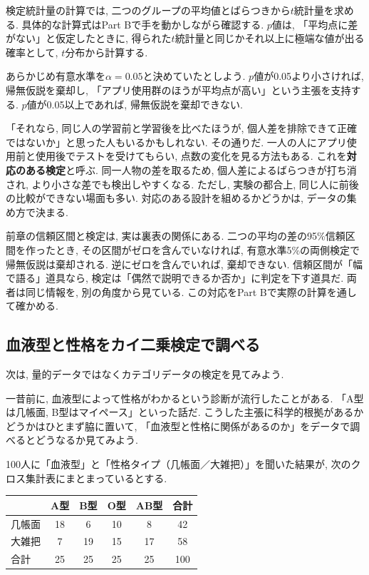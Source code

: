     検定統計量の計算では, 二つのグループの平均値とばらつきから$t$統計量を求める.
    具体的な計算式はPart Bで手を動かしながら確認する.
    $p$値は, 「平均点に差がない」と仮定したときに, 得られた$t$統計量と同じかそれ以上に極端な値が出る確率として, $t$分布から計算する.

    あらかじめ有意水準を$\alpha = 0.05$と決めていたとしよう.
    $p$値が0.05より小さければ, 帰無仮説を棄却し, 「アプリ使用群のほうが平均点が高い」という主張を支持する.
    $p$値が0.05以上であれば, 帰無仮説を棄却できない.

    「それなら, 同じ人の学習前と学習後を比べたほうが, 個人差を排除できて正確ではないか」と思った人もいるかもしれない.
    その通りだ.
    一人の人にアプリ使用前と使用後でテストを受けてもらい, 点数の変化を見る方法もある.
    これを\textbf{対応のある検定}と呼ぶ.
    同一人物の差を取るため, 個人差によるばらつきが打ち消され, より小さな差でも検出しやすくなる.
    ただし, 実験の都合上, 同じ人に前後の比較ができない場面も多い.
    対応のある設計を組めるかどうかは, データの集め方で決まる.

    前章の信頼区間と検定は, 実は裏表の関係にある.
    二つの平均の差の95\%信頼区間を作ったとき, その区間がゼロを含んでいなければ,
    有意水準5\%の両側検定で帰無仮説は棄却される.
    逆にゼロを含んでいれば, 棄却できない.
    信頼区間が「幅で語る」道具なら, 検定は「偶然で説明できるか否か」に判定を下す道具だ.
    両者は同じ情報を, 別の角度から見ている.
    この対応をPart Bで実際の計算を通して確かめる.


  \subsection{血液型と性格をカイ二乗検定で調べる}

    次は, 量的データではなくカテゴリデータの検定を見てみよう.

    一昔前に, 血液型によって性格がわかるという診断が流行したことがある.
    「A型は几帳面, B型はマイペース」といった話だ.
    こうした主張に科学的根拠があるかどうかはひとまず脇に置いて,
    「血液型と性格に関係があるのか」をデータで調べるとどうなるか見てみよう.

    100人に「血液型」と「性格タイプ（几帳面／大雑把）」を聞いた結果が, 次のクロス集計表にまとまっているとする.

    \begin{center}
      \begin{tabular}{l|cccc|c}
             & A型 & B型 & O型 & AB型 & 合計 \\
      \hline
      几帳面 & 18  & 6   & 10  & 8    & 42 \\
      大雑把 & 7   & 19  & 15  & 17   & 58 \\
      \hline
      合計   & 25  & 25  & 25  & 25   & 100
      \end{tabular}
    \end{center}

